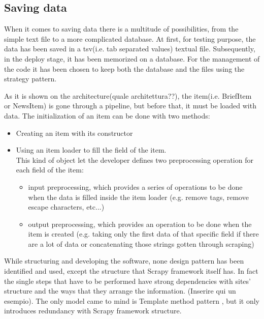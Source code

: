\subsection{Saving data}
When it comes to saving data there is a multitude of possibilities, from the simple text file to a more complicated database. 
At first, for testing purpose, the data has been saved in a tsv(i.e. tab separated values) textual file. Subsequently, in the deploy stage, it has been memorized on a database. For the management of the code it has been chosen to keep both the database and the files using the strategy pattern. 
\par
As it is shown on the architecture(quale architettura??), the item(i.e. BriefItem or NewsItem) is gone through a pipeline, but before that, it must be loaded with data.
The initialization of an item can be done with two methods:
\begin{itemize}
	\item Creating an item with its constructor
	\item Using an item loader to fill the field of the item.\\
	This kind of object let the developer defines two preprocessing operation for each field of the item:
	\begin{itemize}
		\item input preprocessing, which provides a series of operations to be done when the data is filled inside the item loader (e.g. remove tags, remove escape characters, etc...)
		\item output preprocessing, which provides an operation to be done when the item is created (e.g. taking only the first data of that specific field if there are a lot of data or concatenating those strings gotten through scraping)
	\end{itemize}
\end{itemize}
\par While structuring and developing the software, none design pattern has been identified and used, except the structure that Scrapy framework itself has. In fact the single steps that have to be performed have strong dependencies with sites' structure and the ways that they arrange the information. (Inserire qui un esempio). The only model came to mind is Template method pattern \cite{templatepattern}, but it only introduces redundancy with Scrapy framework structure. 


